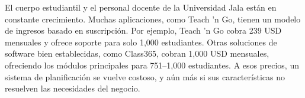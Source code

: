 El cuerpo estudiantil y el personal docente de la Universidad Jala están en constante crecimiento. Muchas aplicaciones, como Teach 'n Go, tienen un modelo de ingresos basado en suscripción. Por ejemplo, Teach 'n Go cobra 239 USD mensuales y ofrece soporte para solo 1,000 estudiantes. Otras soluciones de software bien establecidas, como Class365, cobran 1,000 USD mensuales, ofreciendo los módulos principales para 751–1,000 estudiantes. A esos precios, un sistema de planificación se vuelve costoso, y aún más si sus características no resuelven las necesidades del negocio.
